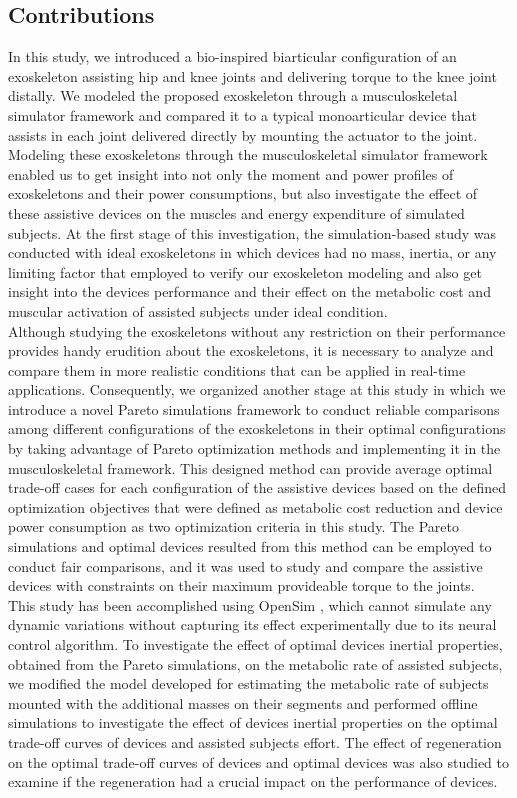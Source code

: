 \documentclass[10pt,letterpaper]{article}
\begin{document}
\subsection*{Contributions}
In this study, we introduced a bio-inspired biarticular configuration of an exoskeleton assisting hip and knee joints and delivering torque to the knee joint distally.  We modeled the proposed exoskeleton through a musculoskeletal simulator framework and compared it to a typical monoarticular device that assists in each joint delivered directly by mounting the actuator to the joint. Modeling these exoskeletons through the musculoskeletal simulator framework enabled us to get insight into not only the moment and power profiles of exoskeletons and their power consumptions, but also investigate the effect of these assistive devices on the muscles and energy expenditure of simulated subjects.
At the first stage of this investigation, the simulation-based study was conducted with ideal exoskeletons in which devices had no mass, inertia, or any limiting factor that employed to verify our exoskeleton modeling and also get insight into the devices performance and their effect on the metabolic cost and muscular activation of assisted subjects under ideal condition. \\
Although studying the exoskeletons without any restriction on their performance provides handy erudition about the exoskeletons, it is necessary to analyze and compare them in more realistic conditions that can be applied in real-time applications. Consequently, we organized another stage at this study in which we introduce a novel Pareto simulations framework to conduct reliable comparisons among different configurations of the exoskeletons in their optimal configurations by taking advantage of Pareto optimization methods and implementing it in the musculoskeletal framework. This designed method can provide average optimal trade-off cases for each configuration of the assistive devices based on the defined optimization objectives that were defined as metabolic cost reduction and device power consumption as two optimization criteria in this study. The Pareto simulations and optimal devices resulted from this method can be employed to conduct fair comparisons, and it was used to study and compare the assistive devices with constraints on their maximum provideable torque to the joints.\\
This study has been accomplished using OpenSim \cite{89}, which cannot simulate any dynamic variations without capturing its effect experimentally due to its neural control algorithm\cite{92}. To investigate the effect of optimal devices inertial properties, obtained from the Pareto simulations, on the metabolic rate of assisted subjects, we modified the model developed for estimating the metabolic rate of subjects mounted with the additional masses on their segments \cite{45} and performed offline simulations to investigate the effect of devices inertial properties on the optimal trade-off curves of devices and assisted subjects effort. The effect of regeneration on the optimal trade-off curves of devices and optimal devices was also studied to examine if the regeneration had a crucial impact on the performance of devices.\\
\end{document}
